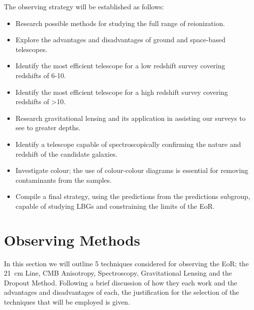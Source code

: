 	The observing strategy will be established as follows:
	\begin{itemize}
		\item Research possible methods for studying the full range of reionization.
		\item Explore the advantages and disadvantages of ground and space-based telescopes.
		\item Identify the most efficient telescope for a low redshift survey covering redshifts of 6-10.
		\item Identify the most efficient telescope for a high redshift survey covering redshifts of >10.
		\item Research gravitational lensing and its application in assisting our surveys to see to greater depths.
		\item Identify a telescope capable of spectroscopically confirming the nature and redshift of the candidate galaxies.
		\item Investigate colour; the use of colour-colour diagrams is essential for removing contaminants from the samples.
		\item Compile a final strategy, using the predictions from the predictions subgroup, capable of studying LBGs and constraining the limits of the EoR.
	\end{itemize}

\section{Observing Methods} %
\label{sec:observing_methods}
	In this section we will outline 5 techniques considered for observing the EoR; the \SI{21}{\centi\metre} Line, CMB Anisotropy, Spectroscopy, Gravitational Lensing and the Dropout Method. Following a brief discussion of how they each work and the advantages and disadvantages of each, the justification for the selection of the techniques that will be employed is given.
